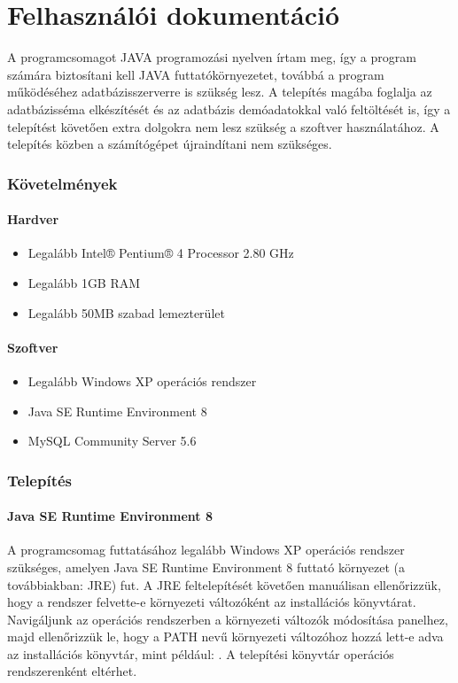 \part{Felhasználói dokumentáció}
A programcsomagot JAVA programozási nyelven írtam meg, így a program számára biztosítani kell JAVA futtatókörnyezetet, továbbá a program működéséhez adatbázisszerverre is szükség lesz. A telepítés magába foglalja az adatbázisséma elkészítését és az adatbázis demóadatokkal való feltöltését is, így a telepítést követően extra dolgokra nem lesz szükség a szoftver használatához. A telepítés közben a számítógépet újraindítani nem szükséges.

\section{Követelmények}
\subsection{Hardver}
\begin{itemize}
\item Legalább Intel® Pentium® 4 Processor 2.80 GHz
\item Legalább 1GB RAM
\item Legalább 50MB szabad lemezterület
\end{itemize}
\subsection{Szoftver}
\begin{itemize}
\item Legalább Windows XP operációs rendszer
\item Java SE Runtime Environment 8
\item MySQL Community Server 5.6
\end{itemize}

\section{Telepítés}
\subsection{Java SE Runtime Environment 8}
A programcsomag futtatásához legalább Windows XP operációs rendszer szükséges, amelyen Java SE Runtime Environment 8 futtató környezet \cite{jresite} (a továbbiakban: JRE) fut. A JRE feltelepítését követően manuálisan ellenőrizzük, hogy a rendszer felvette-e környezeti változóként az installációs könyvtárat. Navigáljunk az operációs rendszerben a környezeti változók módosítása panelhez, majd ellenőrizzük le, hogy a PATH nevű környezeti változóhoz hozzá lett-e adva az installációs könyvtár, mint például: . A telepítési könyvtár operációs rendszerenként eltérhet.

